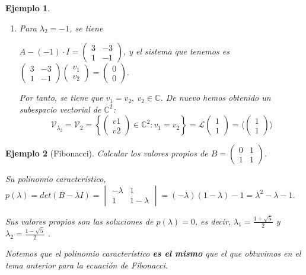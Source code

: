 \documentclass[11pt, a4paper]{article}
\newif\IfInSansMode
\numberwithin{equation}{section}
\theoremstyle{theorem-style}
\theoremstyle{definition-style}
\theoremstyle{remark-style}
\theoremstyle{example-style}
\newtheorem{ejemplo}{Ejemplo}[section]
\newenvironment{nlist}
{\begin{enumerate}
    \renewcommand\labelenumi{(\emph{\roman{enumi})}}}
  {\end{enumerate}}
\begin{document}
\begin{ejemplo}
\begin{nlist}
     \item Para $\lambda_2 = -1$, se tiene

    $A - (-1)\cdot I =
    \begin{pmatrix}
      3 & -3 \\
      1 & -1
    \end{pmatrix}$, y el sistema que tenemos es $
    \begin{pmatrix}
      3 & -3 \\
      1 & -1
    \end{pmatrix}
    \begin{pmatrix}
      v_1 \\
      v_2
    \end{pmatrix} =
    \begin{pmatrix}
      0 \\
      0
    \end{pmatrix}.$
    
    Por tanto, se tiene que $v_1 = v_2,\ v_2 \in \mathbb C$. De nuevo hemos obtenido un subespacio vectorial de $\mathbb
    C^2$:  $$\mathcal V_{\lambda_2} = \mathcal V_2 = \left\{
    \begin{pmatrix}
      v1 \\
      v2
    \end{pmatrix} \in \mathbb C^2 : v_1 = v_2 \right\} = \mathscr L
    \begin{pmatrix}
      1 \\
      1
    \end{pmatrix} = \langle
    \begin{pmatrix}
      1 \\
      1
    \end{pmatrix} \rangle$$
    
    \end{nlist}
  \end{ejemplo}
  
    \begin{ejemplo}[Fibonacci]
    Calcular los valores propios de $B =
    \begin{pmatrix}
      0 & 1 \\
      1 & 1
    \end{pmatrix}$. 
    
    Su polinomio característico, $p(\lambda) = det(B - \lambda I)
    =
    \begin{vmatrix}
      -\lambda & 1 \\
      1 & 1 - \lambda
    \end{vmatrix} = (-\lambda)(1-\lambda) - 1 = \lambda^2 - \lambda - 1$.
    
    Sus valores propios son las soluciones de $p(\lambda) = 0$, es decir,  $\displaystyle \lambda_1 =
    \frac{1 + \sqrt{5}}{2}$ y $\displaystyle \lambda_2 = \frac{1 - \sqrt{5}}{2}$ .
    
    Notemos que el polinomio característico \textbf{es el mismo} que el que obtuvimos en el tema anterior para la ecuación de Fibonacci.

  \end{ejemplo}
  
\end{document}
